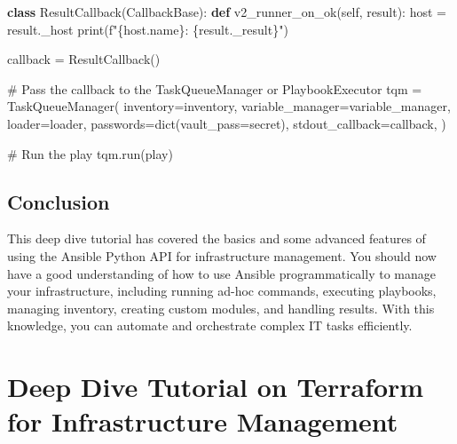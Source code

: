 \documentclass[
  letterpaper,
  DIV=11,
  numbers=noendperiod]{scrreprt}
\newenvironment{Shaded}{\begin{snugshade}}{\end{snugshade}}
\newcommand{\BuiltInTok}[1]{\textcolor[rgb]{0.00,0.23,0.31}{#1}}
\newcommand{\CommentTok}[1]{\textcolor[rgb]{0.37,0.37,0.37}{#1}}
\newcommand{\KeywordTok}[1]{\textcolor[rgb]{0.00,0.23,0.31}{\textbf{#1}}}
\newcommand{\NormalTok}[1]{\textcolor[rgb]{0.00,0.23,0.31}{#1}}
\newcommand{\OperatorTok}[1]{\textcolor[rgb]{0.37,0.37,0.37}{#1}}
\newcommand{\SpecialCharTok}[1]{\textcolor[rgb]{0.37,0.37,0.37}{#1}}
\newcommand{\SpecialStringTok}[1]{\textcolor[rgb]{0.13,0.47,0.30}{#1}}
\newcommand{\StringTok}[1]{\textcolor[rgb]{0.13,0.47,0.30}{#1}}
\newcommand{\VariableTok}[1]{\textcolor[rgb]{0.07,0.07,0.07}{#1}}
\begin{document}
\begin{Shaded}
\begin{Highlighting}[]
\KeywordTok{class}\NormalTok{ ResultCallback(CallbackBase):}
    \KeywordTok{def}\NormalTok{ v2\_runner\_on\_ok(}\VariableTok{self}\NormalTok{, result):}
\NormalTok{        host }\OperatorTok{=}\NormalTok{ result.\_host}
        \BuiltInTok{print}\NormalTok{(}\SpecialStringTok{f"}\SpecialCharTok{\{}\NormalTok{host}\SpecialCharTok{.}\NormalTok{name}\SpecialCharTok{\}}\SpecialStringTok{: }\SpecialCharTok{\{}\NormalTok{result}\SpecialCharTok{.}\NormalTok{\_result}\SpecialCharTok{\}}\SpecialStringTok{"}\NormalTok{)}

\NormalTok{callback }\OperatorTok{=}\NormalTok{ ResultCallback()}

\CommentTok{\# Pass the callback to the TaskQueueManager or PlaybookExecutor}
\NormalTok{tqm }\OperatorTok{=}\NormalTok{ TaskQueueManager(}
\NormalTok{    inventory}\OperatorTok{=}\NormalTok{inventory,}
\NormalTok{    variable\_manager}\OperatorTok{=}\NormalTok{variable\_manager,}
\NormalTok{    loader}\OperatorTok{=}\NormalTok{loader,}
\NormalTok{    passwords}\OperatorTok{=}\BuiltInTok{dict}\NormalTok{(vault\_pass}\OperatorTok{=}\StringTok{\textquotesingle{}secret\textquotesingle{}}\NormalTok{),}
\NormalTok{    stdout\_callback}\OperatorTok{=}\NormalTok{callback,}
\NormalTok{)}

\CommentTok{\# Run the play}
\NormalTok{tqm.run(play)}
\end{Highlighting}
\end{Shaded}

\section{Conclusion}\label{conclusion-40}

This deep dive tutorial has covered the basics and some advanced
features of using the Ansible Python API for infrastructure management.
You should now have a good understanding of how to use Ansible
programmatically to manage your infrastructure, including running ad-hoc
commands, executing playbooks, managing inventory, creating custom
modules, and handling results. With this knowledge, you can automate and
orchestrate complex IT tasks efficiently.


\chapter{Deep Dive Tutorial on Terraform for Infrastructure
Management}\label{deep-dive-tutorial-on-terraform-for-infrastructure-management}
\end{document}
